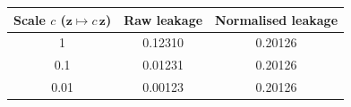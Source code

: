 \begin{tabular}{@{}ccc@{}}
\toprule
Scale $c$ ($\mathbf z\mapsto c\,\mathbf z$) & Raw leakage & Normalised leakage \\
\midrule
1 & 0.12310 & 0.20126 \\
0.1 & 0.01231 & 0.20126 \\
0.01 & 0.00123 & 0.20126 \\
\bottomrule
\end{tabular}